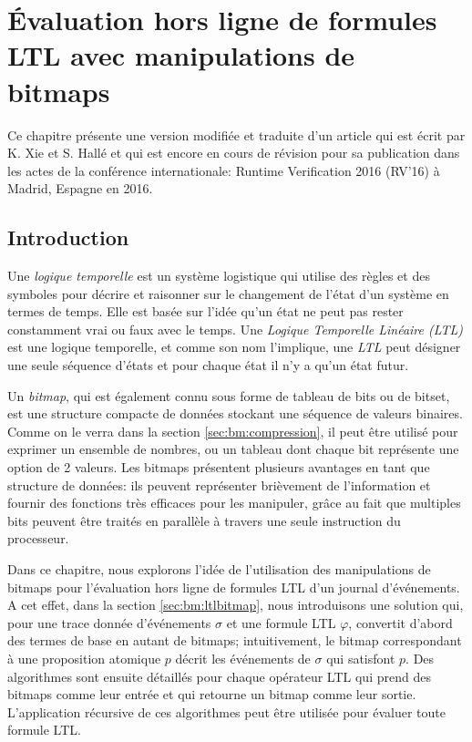 
\chapter{Évaluation hors ligne de formules LTL avec manipulations de bitmaps}

Ce chapitre présente une version modifiée et traduite d'un article qui est écrit par K. Xie et S. Hallé et qui est encore en cours de révision pour sa publication dans les actes de la conférence internationale: Runtime Verification 2016 (RV'16) à Madrid, Espagne en 2016.

\section{Introduction}\label{sec:bm:intro} %

Une \emph{logique temporelle} \citep{huth2004} est un système logistique qui utilise des règles et des symboles pour décrire et raisonner sur le changement de l'état d'un système en termes de temps. Elle est basée sur l'idée qu'un état ne peut pas rester constamment vrai ou faux avec le temps. Une \emph{Logique Temporelle Linéaire (LTL)} \citep{pnueli97} est une logique temporelle, et comme son nom l'implique, une \emph{LTL} peut désigner une seule séquence d'états et pour chaque état il n'y a qu'un état futur.

Un \emph{bitmap}, qui est également connu sous forme de tableau de bits ou de bitset, est une structure compacte de données stockant une séquence de valeurs binaires. Comme on le verra dans la section \ref{sec:bm:compression}, il peut être utilisé pour exprimer un ensemble de nombres, ou un tableau dont chaque bit représente une option de 2 valeurs. Les bitmaps présentent plusieurs avantages en tant que structure de données: ils peuvent représenter brièvement de l'information et fournir des fonctions très efficaces pour les manipuler, grâce au fait que multiples bits peuvent être traités en parallèle à travers une seule instruction du processeur.

Dans ce chapitre, nous explorons l'idée de l'utilisation des manipulations de bitmaps pour l'évaluation hors ligne de formules LTL d'un journal d'événements. A cet effet, dans la section \ref{sec:bm:ltlbitmap}, nous introduisons une solution qui, pour une trace donnée d'événements $\sigma$ et une formule LTL $\varphi$, convertit d'abord des termes de base en autant de bitmaps; intuitivement, le bitmap correspondant à une proposition atomique $p$ décrit les événements de $\sigma$ qui satisfont $p$. Des algorithmes sont ensuite détaillés pour chaque opérateur LTL qui prend des bitmaps comme leur entrée et qui retourne un bitmap comme leur sortie. L'application récursive de ces algorithmes peut être utilisée pour évaluer toute formule LTL.

